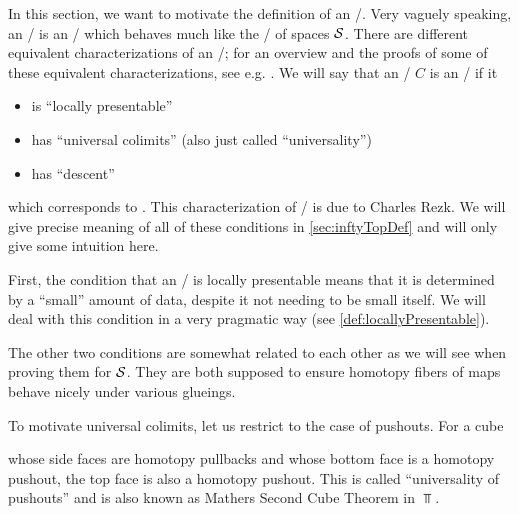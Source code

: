 In this section, we want to motivate the definition of an \inftytop/.
Very vaguely speaking, an \inftytop/ is an \inftycat/ which behaves much like the \inftycat/ of spaces $\mathcal{S}$.
There are different equivalent characterizations of an \inftytop/; for an overview and the proofs of some of these equivalent characterizations, see e.g. \cite[\S 6.1]{HTT}.
We will say that an \inftycat/ $C$ is an \inftytop/ if it 
\begin{itemize} 
    \item is ``locally presentable''
    \item has ``universal colimits'' (also just called ``universality'')
    \item has ``descent'' 
\end{itemize}
which corresponds to \cite[Theorem 6.1.0.6 (2)]{HTT}.
This characterization of \inftytops/ is due to Charles Rezk.
We will give precise meaning of all of these conditions in \cref{sec:inftyTopDef} and will only give some intuition here.

First, the condition that an \inftycat/ is locally presentable means that it is determined by a ``small'' amount of data, despite it not needing to be small itself.
We will deal with this condition in a very pragmatic way (see \cref{def:locallyPresentable}).

The other two conditions are somewhat related to each other as we will see when proving them for $\mathcal{S}$.
They are both supposed to ensure homotopy fibers of maps behave nicely under various glueings.

To motivate universal colimits, let us restrict to the case of pushouts.
For a cube 
\begin{center}
\end{center}
whose side faces are homotopy pullbacks and whose bottom face is a homotopy pushout, the top face is also a homotopy pushout.
This is called ``universality of pushouts'' and is also known as Mathers Second Cube Theorem in $\Top$.

